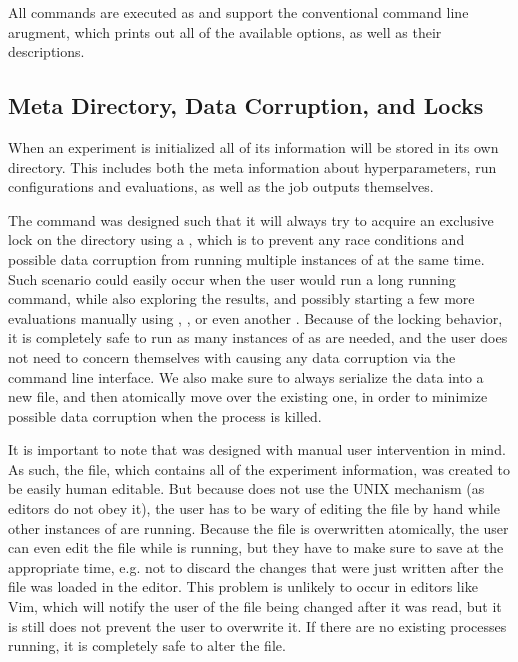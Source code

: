 All commands are executed as  and support the conventional  command line arugment, which prints out all of the available options, as well as their descriptions.

\subsection{Meta Directory, Data Corruption,  and Locks}

When an experiment is initialized all of its information will be stored in its own directory. This includes both the meta information about hyperparameters, run configurations and evaluations, as well as the job outputs themselves.

The \bopt command was designed such that it will always try to acquire an exclusive lock on the directory using a , which is to prevent any race conditions and possible data corruption from running multiple instances of \bopt at the same time. Such scenario could easily occur when the user would run a long running  command, while also exploring the results, and possibly starting a few more evaluations manually using , , or even another . Because of the locking behavior, it is completely safe to run as many instances of \bopt as are needed, and the user does not need to concern themselves with causing any data corruption via the command line interface. We also make sure to always serialize the data into a new file, and then atomically move over the existing one, in order to minimize possible data corruption when the \bopt process is killed.

It is important to note that \bopt was designed with manual user intervention in mind. As such, the  file, which contains all of the experiment information, was created to be easily human editable. But because \bopt does not use the UNIX  mechanism (as editors do not obey it), the user has to be wary of editing the file by hand while other instances of \bopt are running. Because the  file is overwritten atomically, the user can even edit the file while \bopt is running, but they have to make sure to save at the appropriate time, e.g. not to discard the changes that were just written after the file was loaded in the editor. This problem is unlikely to occur in editors like Vim, which will notify the user of the file being changed after it was read, but it is still does not prevent the user to overwrite it. If there are no existing \bopt processes running, it is completely safe to alter the  file.

